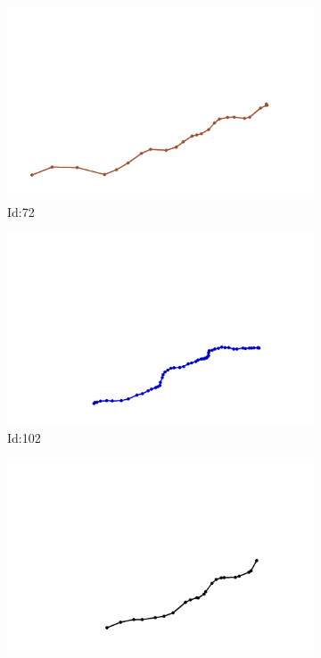 \documentclass[12pt,twoside]{report}
\begin{document}
\begin{figure}
\centering
\begin{subfigure}[b]{0.20\textwidth}
\centering
\includegraphics[width=\textwidth]{../../trajectories/72.png}
\caption{Id:72}
\end{subfigure}
\begin{subfigure}[b]{0.20\textwidth}
\centering
\includegraphics[width=\textwidth]{../../trajectories/102.png}
\caption{Id:102}
\end{subfigure}
\begin{subfigure}[b]{0.20\textwidth}
\centering
\includegraphics[width=\textwidth]{../../trajectories/640.png}

\end{subfigure}
\end{figure}
\end{document}
